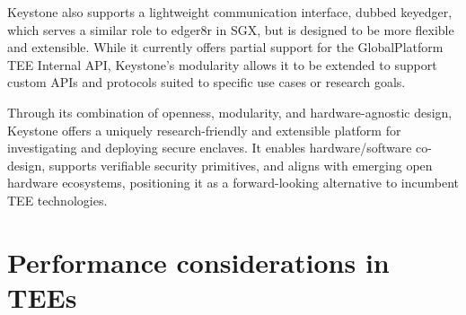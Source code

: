 Keystone also supports a lightweight communication interface, dubbed keyedger, which serves a similar role to edger8r in SGX, but is designed to be more flexible and extensible. While it currently offers partial support for the GlobalPlatform TEE Internal API, Keystone’s modularity allows it to be extended to support custom APIs and protocols suited to specific use cases or research goals.



Through its combination of openness, modularity, and hardware-agnostic design, Keystone offers a uniquely research-friendly and extensible platform for investigating and deploying secure enclaves. It enables hardware/software co-design, supports verifiable security primitives, and aligns with emerging open hardware ecosystems, positioning it as a forward-looking alternative to incumbent TEE technologies.

\section{Performance considerations in TEEs}